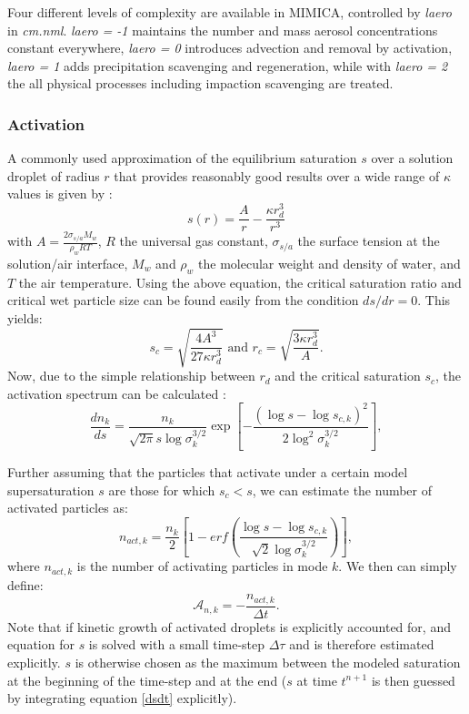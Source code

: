 \documentclass[12pt,A4,french]{article}
\begin{document}
Four different levels of complexity are available in MIMICA, controlled by {\it laero} in {\it cm.nml}. {\it laero = -1} maintains the number and mass aerosol concentrations constant everywhere, {\it laero = 0} introduces advection and removal by activation, {\it laero = 1} adds precipitation scavenging and regeneration, while with {\it laero = 2} the all physical processes including impaction scavenging are treated.

\subsubsection{Activation}

A commonly used approximation of the equilibrium saturation $s$ over a solution droplet of radius $r$ that provides reasonably good results over a wide range of $\kappa$ values is given by \cite{SP1998}:
\begin{equation}
    \label{seq}
    s\left(r\right) = \frac{A}{r} - \frac{\kappa r_d^3}{r^3}
\end{equation}
with $A = \frac{2\sigma_{s/a}M_w}{\rho_w R T}$, $R$ the universal gas constant, $\sigma_{s/a}$ the surface tension at the solution/air interface, $M_w$ and $\rho_w$ the molecular weight and density of water, and $T$ the air temperature. Using the above equation, the critical saturation ratio and critical wet particle size can be found easily from the condition $d s/ d r = 0$. This yields:
\begin{equation}
    s_c = \sqrt{\frac{4A^3}{27\kappa r_d^3}}\mbox{     and     } r_c = \sqrt{\frac{3\kappa r_d^3}{A}}.
\end{equation}
Now, due to the simple relationship between $r_d$ and the critical saturation $s_c$, the activation spectrum can be calculated  \cite{KC2006, Gal2011}:
\begin{equation}
    \frac{dn_k}{ds} = \frac{n_k}{\sqrt{2\pi}s\log\sigma^{3/2}_k}\exp\left[-\frac{\left(\log s - \log s_{c,k}\right)^2}{2\log^2\sigma^{3/2}_k}\right],
\end{equation}

Further assuming that the particles that activate under a certain model supersaturation $s$ are those for which $s_c < s$, we can estimate the number of activated particles as:
\begin{equation}
    n_{act,k} = \frac{n_k}{2}\left[1 - erf \left(\frac{\log s - \log s_{c,k}}{\sqrt{2}\log\sigma^{3/2}_k}\right)\right],
\end{equation}
where $n_{act,k}$ is the number of activating particles in mode $k$. We then can simply define:
\begin{equation}
    \mathcal{A}_{n,k} = -\frac{n_{act,k}}{\Delta t}.
\end{equation}
Note that if kinetic growth of activated droplets is explicitly accounted for, and equation for $s$ is solved with a small time-step $\Delta \tau$ and is therefore estimated explicitly. $s$ is otherwise chosen as the maximum between the modeled saturation at the beginning of the time-step and at the end ($s$ at time $t^{n+1}$ is then guessed by integrating equation \ref{dsdt} explicitly).
\end{document}

